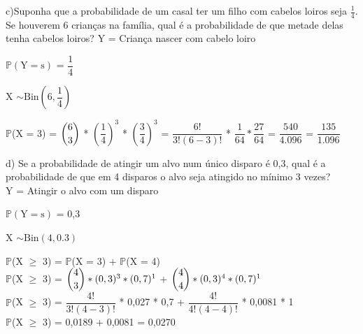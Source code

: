 \documentclass[12pt,a4paper,draft]{article}
\begin{document}
	\vspace{1cm}
	c)Suponha que a probabilidade de um casal ter um filho com cabelos loiros seja $\frac{1}{4}$. Se houverem 6 crianças na  família, qual é a probabilidade de que metade delas tenha cabelos loiros?
	\vspace{0.5cm}
	Y = Criança nascer com cabelo loiro
	\begin{center}
		\vspace{1cm}
		$\mathbb{P}\left(\text{Y} = \text{s}\right)$ = $\dfrac{1}{4}$
		\vspace{1cm}\\
	\end{center}
	X $\sim \text{Bin}\left(6, \dfrac{1}{4}\right)$
	\vspace{1cm}\\
	\begin{center}
		$\mathbb{P}$(X = 3) = $\dbinom{6}{3}$ * $\left(\dfrac{1}{4}\right)^3$ * $\left(\dfrac{3}{4}\right)^3$ = $\dfrac{6!}{3!(6-3)!}$ * $\dfrac{1}{64} * \dfrac{27}{64}$ = $\dfrac{540}{4.096}$ = $\dfrac{135}{1.096}$
	\end{center}
	\vspace{1cm}
	d) Se a probabilidade de atingir um alvo num único disparo é 0,3, qual é a probabilidade de que em 4 disparos o alvo  seja atingido no mínimo 3 vezes?
	\vspace{0.5cm}\\
	Y = Atingir o alvo com um disparo
	\begin{center}
		\vspace{1cm}
		$\mathbb{P}\left(\text{Y} = \text{s}\right)$ = 0,3
	\end{center}
	\vspace{1cm}
	X $\sim \text{Bin}(4, 0.3)$
	\begin{center}
		\vspace{1cm}
		$\mathbb{P}$(X $\geq$ 3) = $\mathbb{P}$(X = 3) + $\mathbb{P}$(X  = 4)
		\vspace{0.5cm}\\
		$\mathbb{P}$(X $\geq$ 3) = $\dbinom{4}{3} * (0,3)^3 * (0,7)^1$ + $\dbinom{4}{4} * (0,3)^4 * (0,7)^1$
		\vspace{0.5cm}\\
		$\mathbb{P}$(X $\geq$ 3) = $\dfrac{4!}{3!(4-3)!}$ * 0,027 * 0,7 + $\dfrac{4!}{4!(4-4)!}$ * 0,0081 * 1 
		\vspace{0.5cm}\\
		$\mathbb{P}$(X $\geq$ 3) = 0,0189 + 0,0081 = 0,0270
	\end{center}
	\vspace{1cm}
\end{document}
